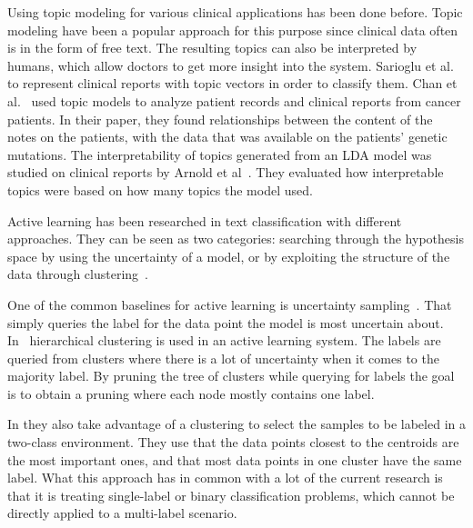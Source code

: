 Using topic modeling for various clinical applications has been done before.
Topic modeling have been a popular approach for this purpose since clinical data often is in the form of free text.
The resulting topics can also be interpreted by humans, which allow doctors to get more insight into the system.
Sarioglu et al\@.~\cite{sarioglu2013topic} to represent clinical reports with topic vectors in order to classify them.
Chan et al\@.~\cite{chan2013empirical} used topic models to analyze patient records and clinical reports from cancer patients.
In their paper, they found relationships between the content of the notes on the patients, with the data that was available on the patients' genetic mutations.
The interpretability of topics generated from an LDA model was studied on clinical reports by Arnold et al~\cite{arnold2016evaluating}.
They evaluated how interpretable topics were based on how many topics the model used.

Active learning has been researched in text classification with different approaches.
They can be seen as two categories: searching through the hypothesis space by using the uncertainty of a model, or by exploiting the structure of the data through clustering~\cite{dasgupta2008hierarchical}.

One of the common baselines for active learning is uncertainty sampling~\cite{lewis1994sequential}.
That simply queries the label for the data point the model is most uncertain about.
In~\cite{dasgupta2008hierarchical} hierarchical clustering is used in an active learning system.
The labels are queried from clusters where there is a lot of uncertainty when it comes to the majority label.
By pruning the tree of clusters while querying for labels the goal is to obtain a pruning where each node mostly contains one label.

In \cite{nguyen2004active} they also take advantage of a clustering to select the samples to be labeled in a two-class environment.
They use that the data points closest to the centroids are the most important ones, and that most data points in one cluster have the same label.
What this approach has in common with a lot of the current research is that it is treating single-label or binary classification problems, which cannot be directly applied to a multi-label scenario.

